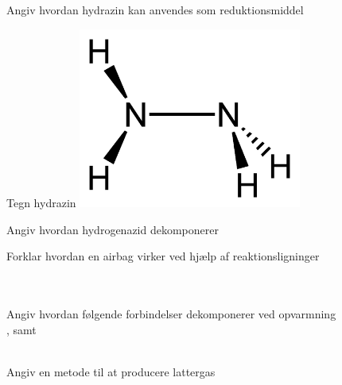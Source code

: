 \begin{flashcard}[Egenskab]{Angiv hvordan hydrazin kan anvendes som reduktionsmiddel}
\\ \vspace{7pt}
\end{flashcard}

\begin{flashcard}[Struktur]{Tegn hydrazin}
\includegraphics[width=0.55\textwidth]{figures/Hydrazin.png}
\end{flashcard}

\begin{flashcard}[Reaktion]{Angiv hvordan hydrogenazid dekomponerer}
\end{flashcard}

\begin{flashcard}[Anvendelse]{Forklar hvordan en airbag virker ved hjælp af reaktionsligninger}
\\
\\
\\
\end{flashcard}

\begin{flashcard}[Reaktion]{Angiv hvordan følgende forbindelser dekomponerer ved opvarmning\\
,  samt 
}
\\ \vspace{7pt}
\\ \vspace{7pt}
\end{flashcard}

\begin{flashcard}[Reaktion]{Angiv en metode til at producere lattergas}
\end{flashcard}

